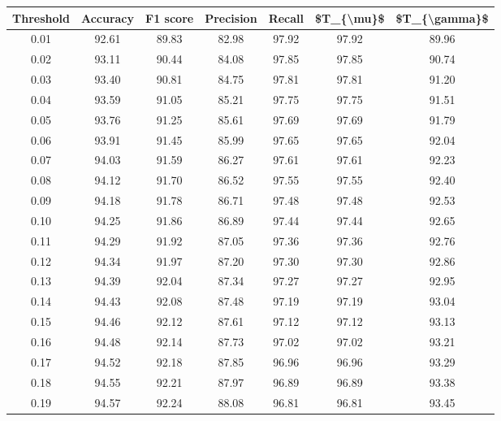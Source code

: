 \begin{tabular}{|c|c|c|c|c|c|c|}
\hline
 Threshold &  Accuracy &  F1 score &  Precision &  Recall &  \$T\_\{\textbackslash mu\}\$ &  \$T\_\{\textbackslash gamma\}\$ \\
\hline
      0.01 &     92.61 &     89.83 &      82.98 &   97.92 &      97.92 &         89.96 \\
      0.02 &     93.11 &     90.44 &      84.08 &   97.85 &      97.85 &         90.74 \\
      0.03 &     93.40 &     90.81 &      84.75 &   97.81 &      97.81 &         91.20 \\
      0.04 &     93.59 &     91.05 &      85.21 &   97.75 &      97.75 &         91.51 \\
      0.05 &     93.76 &     91.25 &      85.61 &   97.69 &      97.69 &         91.79 \\
      0.06 &     93.91 &     91.45 &      85.99 &   97.65 &      97.65 &         92.04 \\
      0.07 &     94.03 &     91.59 &      86.27 &   97.61 &      97.61 &         92.23 \\
      0.08 &     94.12 &     91.70 &      86.52 &   97.55 &      97.55 &         92.40 \\
      0.09 &     94.18 &     91.78 &      86.71 &   97.48 &      97.48 &         92.53 \\
      0.10 &     94.25 &     91.86 &      86.89 &   97.44 &      97.44 &         92.65 \\
      0.11 &     94.29 &     91.92 &      87.05 &   97.36 &      97.36 &         92.76 \\
      0.12 &     94.34 &     91.97 &      87.20 &   97.30 &      97.30 &         92.86 \\
      0.13 &     94.39 &     92.04 &      87.34 &   97.27 &      97.27 &         92.95 \\
      0.14 &     94.43 &     92.08 &      87.48 &   97.19 &      97.19 &         93.04 \\
      0.15 &     94.46 &     92.12 &      87.61 &   97.12 &      97.12 &         93.13 \\
      0.16 &     94.48 &     92.14 &      87.73 &   97.02 &      97.02 &         93.21 \\
      0.17 &     94.52 &     92.18 &      87.85 &   96.96 &      96.96 &         93.29 \\
      0.18 &     94.55 &     92.21 &      87.97 &   96.89 &      96.89 &         93.38 \\
      0.19 &     94.57 &     92.24 &      88.08 &   96.81 &      96.81 &         93.45 \\

\end{tabular}
